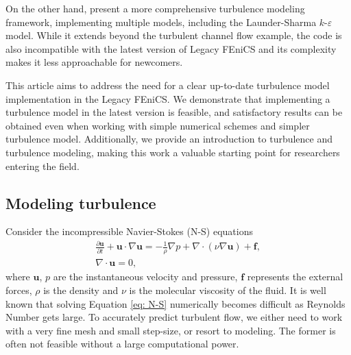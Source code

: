 On the other hand, \cite{mortensen_fenics-based_2011} present a more comprehensive turbulence modeling framework, implementing multiple models, including the Launder-Sharma \(k\)-\(\varepsilon\) model. While it extends beyond the turbulent channel flow example, the code is also incompatible with the latest version of Legacy FEniCS and its complexity makes it less approachable for newcomers.

This article aims to address the need for a clear up-to-date turbulence model implementation in the Legacy FEniCS. We demonstrate that implementing a turbulence model in the latest version is feasible, and satisfactory results can be obtained even when working with simple numerical schemes and simpler turbulence model. Additionally, we provide an introduction to turbulence and turbulence modeling, making this work a valuable starting point for researchers entering the field. 

\subsection{Modeling turbulence}

Consider the incompressible Navier-Stokes (N-S) equations
\begin{equation}\label{eq: N-S}
    \begin{split}
        \frac{\partial \mathbf{u}}{\partial t} + \mathbf{u} \cdot \nabla{\mathbf{u}}
        = 
        - \frac{1}{\rho} \nabla p + \nabla \cdot (\nu \nabla \mathbf{u}) + \mathbf{f},
        \\
        \nabla \cdot \mathbf{u}
        = 0,
    \end{split}
\end{equation}
where \(\mathbf{u}\), \(p\) are the instantaneous velocity and pressure, \(\mathbf{f}\) represents the external forces, \(\rho\) is the density and \(\nu\) is the molecular viscosity of the fluid. It is well known that solving Equation \eqref{eq: N-S} numerically becomes difficult as Reynolds Number gets large. To accurately predict turbulent flow, we either need to work with a very fine mesh and small step-size, or resort to modeling. The former is often not feasible without a large computational power.

